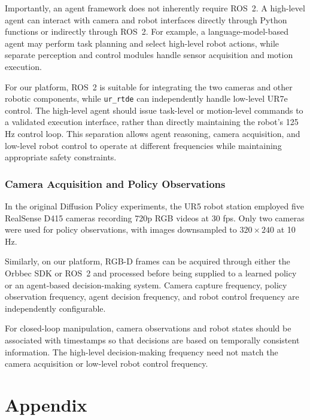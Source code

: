 \documentclass[11pt,a4paper]{article}
\begin{document}
Importantly, an agent framework does not inherently require ROS~2. A high-level agent can interact with camera and robot interfaces directly through Python functions or indirectly through ROS~2. For example, a language-model-based agent may perform task planning and select high-level robot actions, while separate perception and control modules handle sensor acquisition and motion execution.

For our platform, ROS~2 is suitable for integrating the two cameras and other robotic components, while \texttt{ur\_rtde} can independently handle low-level UR7e control. The high-level agent should issue task-level or motion-level commands to a validated execution interface, rather than directly maintaining the robot's 125 Hz control loop. This separation allows agent reasoning, camera acquisition, and low-level robot control to operate at different frequencies while maintaining appropriate safety constraints.

\subsubsection{Camera Acquisition and Policy Observations}

In the original Diffusion Policy experiments, the UR5 robot station employed five RealSense D415 cameras recording 720p RGB videos at 30 fps. Only two cameras were used for policy observations, with images downsampled to $320\times240$ at 10 Hz.

Similarly, on our platform, RGB-D frames can be acquired through either the Orbbec SDK or ROS~2 and processed before being supplied to a learned policy or an agent-based decision-making system. Camera capture frequency, policy observation frequency, agent decision frequency, and robot control frequency are independently configurable.

For closed-loop manipulation, camera observations and robot states should be associated with timestamps so that decisions are based on temporally consistent information. The high-level decision-making frequency need not match the camera acquisition or low-level robot control frequency.











\section{Appendix}
\end{document}
